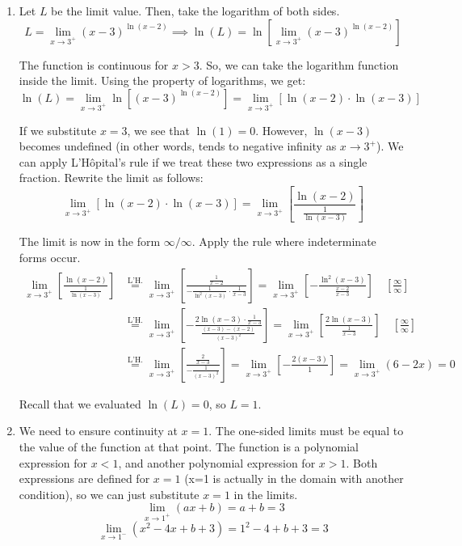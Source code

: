 \documentclass[a4paper, 12pt]{article}
\begin{document}
\begin{enumerate}[leftmargin=*,label=\textbf{\arabic*.}]
\item Let $L$ be the limit value. Then, take the logarithm of both sides.
\[L = \lim_{x\to3^+}(x-3)^{\ln(x-2)}\implies\ln(L) = \ln\left[\lim_{x\to3^+}(x-3)^{\ln(x-2)}\right]\]

The function is continuous for $x > 3$. So, we can take the logarithm function inside the limit. Using the property of logarithms, we get:
\[\ln(L) = \lim_{x\to3^+}\ln\left[(x-3)^{\ln(x-2)}\right] = \lim_{x\to3^+}\left[\ln(x-2)\cdot \ln(x-3)\right]\]

If we substitute $x=3$, we see that $\ln(1) = 0$. However, $\ln(x-3)$ becomes undefined (in other words, tends to negative infinity as $x\to3^+$). We can apply L'Hôpital's rule if we treat these two expressions as a single fraction. Rewrite the limit as follows:
\[\lim_{x\to3^+}\left[\ln(x-2) \cdot \ln(x-3)\right] =\lim_{x\to3^+}\left[\frac{\ln(x-2)}{\frac{1}{\ln(x-3)}}\right]  \]

The limit is now in the form $\infty/\infty$. Apply the rule where indeterminate forms occur.
\begin{align*}
    \lim_{x\to3^+}\left[\frac{\ln(x-2)}{\frac{1}{\ln(x-3)}}\right] &\overset{\text{L'H.}}{=} \lim_{x\to3^+} \left[\frac{\frac{1}{x-2}}{-\frac{1}{\ln^2(x-3)}\cdot {\frac{1}{x-3}}}\right] = \lim_{x\to3^+} \left[-\frac{\ln^2(x-3)}{\frac{x-2}{x-3}}\right] \quad \left[\frac{\infty}{\infty}\right] \\[1em]
    &\overset{\text{L'H.}}{=} \lim_{x\to3^+}\left[-\frac{2\ln(x-3)\cdot\frac{1}{x-3}}{\frac{(x-3) -(x-2)}{(x-3)^2}}\right] = \lim_{x\to3^+} \left[\frac{2\ln(x-3)}{\frac{1}{x-3}}\right] \quad \left[\frac{\infty}{\infty}\right] \\[1em]
    &\overset{\text{L'H.}}{=} \lim_{x\to3^+} \left[\frac{\frac{2}{x-3}}{-\frac{1}{(x-3)^2}}\right] = \lim_{x\to3^+} \left[-\frac{2(x-3)}{1}\right]=\lim_{x\to3^+} (6-2x)=0
\end{align*}

Recall that we evaluated $\ln(L) = 0$, so $\boxed{L = 1}$.

\item We need to ensure continuity at $x=1$. The one-sided limits must be equal to the value of the function at that point. The function is a polynomial expression for $x<1$, and another polynomial expression for $x>1$. Both expressions are defined for $x=1$ (x=1 is actually in the domain with another condition), so we can just substitute $x=1$ in the limits.
\[\lim_{x\to1^+} (ax+b) = a+b = 3\]
\[\lim_{x\to1^-} (x^2-4x+b+3) = 1^2 -4 +b+3 =  3\]


\end{enumerate}
\end{document}
